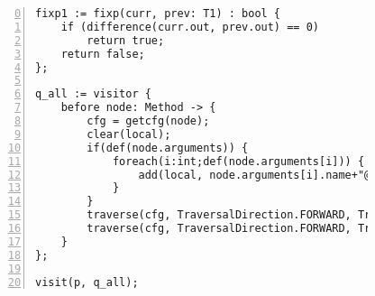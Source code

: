 \begin{figure}[ht!]
\begin{lstlisting}[numbers=left, tabsize=4, caption={Local must not alias},label={lst:lmna-code},firstline=0, firstnumber=0, lastline = 42]
fixp1 := fixp(curr, prev: T1) : bool {
	if (difference(curr.out, prev.out) == 0)
		return true;	
	return false;
};

q_all := visitor {
	before node: Method -> {
		cfg = getcfg(node);
		clear(local);
		if(def(node.arguments)) {
			foreach(i:int;def(node.arguments[i])) {
				add(local, node.arguments[i].name+"@argument"+string(i));
			}
		}
		traverse(cfg, TraversalDirection.FORWARD, TraversalKind.HYBRID, init);
		traverse(cfg, TraversalDirection.FORWARD, TraversalKind.HYBRID, alias, fixp1);
	}
};

visit(p, q_all);
\end{lstlisting}
\end{figure}